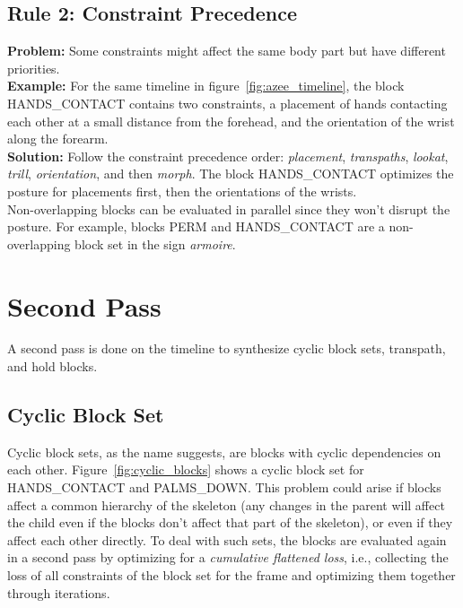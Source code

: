 \documentclass[../../main.tex]{subfiles}
\begin{document}
\subsection{Rule 2: Constraint Precedence}
\label{ch:multi_track:resolve_conflicts:rule2}

\textbf{Problem:} Some constraints might affect the same body part but have different priorities. \\

\textbf{Example:} For the same timeline in figure~\ref{fig:azee_timeline}, the block HANDS\_CONTACT contains two constraints, a placement of hands contacting each other at a small distance from the forehead, and the orientation of the wrist along the forearm. \\

\textbf{Solution:} Follow the constraint precedence order: \emph{placement}, \emph{transpaths}, \emph{lookat}, \emph{trill}, \emph{orientation}, and then \emph{morph}. The block HANDS\_CONTACT optimizes the posture for placements first, then the orientations of the wrists. \\

Non-overlapping blocks can be evaluated in parallel since they won't disrupt the posture. For example, blocks PERM and HANDS\_CONTACT are a non-overlapping block set in the sign \emph{armoire}.

\section{Second Pass}
\label{ch:multi_track:second_pass}

A second pass is done on the timeline to synthesize cyclic block sets, transpath, and hold blocks.

\subsection{Cyclic Block Set}
\label{ch:multi_track:second_pass:cyclic_blocks}

Cyclic block sets, as the name suggests, are blocks with cyclic dependencies on each other. Figure~\ref{fig:cyclic_blocks} shows a cyclic block set for HANDS\_CONTACT and PALMS\_DOWN. This problem could arise if blocks affect a common hierarchy of the skeleton (any changes in the parent will affect the child even if the blocks don't affect that part of the skeleton), or even if they affect each other directly. To deal with such sets, the blocks are evaluated again in a second pass by optimizing for a \emph{cumulative flattened loss}, i.e., collecting the loss of all constraints of the block set for the frame and optimizing them together through iterations.
\end{document}
